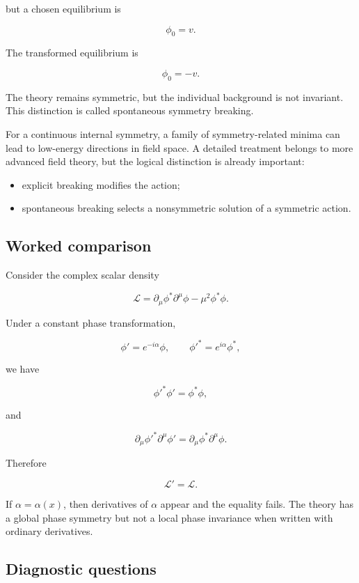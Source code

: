 but a chosen equilibrium is

\[
\phi_0=v.
\]

The transformed equilibrium is

\[
\phi_0=-v.
\]

The theory remains symmetric, but the individual background is not invariant. This distinction is called spontaneous symmetry breaking.

For a continuous internal symmetry, a family of symmetry-related minima can lead to low-energy directions in field space. A detailed treatment belongs to more advanced field theory, but the logical distinction is already important:

\begin{itemize}
    \item explicit breaking modifies the action;
    \item spontaneous breaking selects a nonsymmetric solution of a symmetric action.
\end{itemize}

\subsection{Worked comparison}

Consider the complex scalar density

\[
\mathcal{L}
=
\partial_{\mu}\phi^{*}
\partial^{\mu}\phi
-
\mu^{2}\phi^{*}\phi.
\]

Under a constant phase transformation,

\[
\phi'
=
e^{-i\alpha}\phi,
\qquad
\phi'^{*}
=
e^{i\alpha}\phi^{*},
\]

we have

\[
\phi'^{*}\phi'
=
\phi^{*}\phi,
\]

and

\[
\partial_{\mu}\phi'^{*}
\partial^{\mu}\phi'
=
\partial_{\mu}\phi^{*}
\partial^{\mu}\phi.
\]

Therefore

\[
\mathcal{L}'=\mathcal{L}.
\]

If \(\alpha=\alpha(x)\), then derivatives of \(\alpha\) appear and the equality fails. The theory has a global phase symmetry but not a local phase invariance when written with ordinary derivatives.

\subsection{Diagnostic questions}

